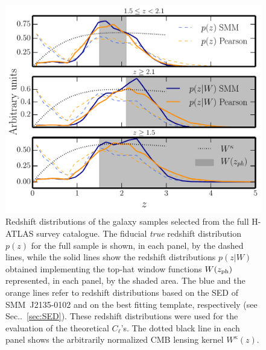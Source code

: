 %
\begin{figure} %
\centering %
\includegraphics[width=\textwidth]{Chapter4/Images/hatlas_dndz_ALL}
\caption{Redshift distributions of the galaxy samples selected from the full H-ATLAS survey catalogue. The fiducial  \emph{true} redshift distribution $p(z)$ for the full sample is shown, in each panel, by the dashed lines, while the solid lines show the redshift distributions $p(z|W)$ obtained implementing the top-hat window functions $W(z_{\rm{ph}})$ represented, in each panel, by the shaded area. The blue and the orange lines refer to redshift distributions based on the SED of SMM~J2135-0102 and on the \citet{Pearson2013} best fitting template, respectively (see Sec..~\eqref{sec:SED}). These redshift distributions were used for the evaluation of the theoretical $C_{\ell}$'s. The dotted black line in each panel shows the arbitrarily normalized CMB lensing kernel $W^{\kappa}(z)$.
  \label{fig:dndzxc2}}
\end{figure}
%



